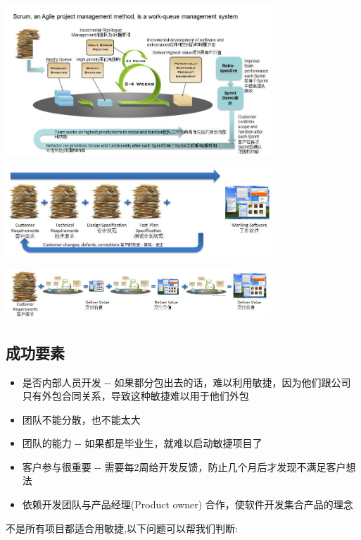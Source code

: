 \includegraphics[width=10cm]{0A_Agile_stories_p13.jpg}

\includegraphics[width=10cm]{P12_1.jpg}

\includegraphics[width=10cm]{P12_2.jpg}

\hypertarget{ux6210ux529fux8981ux7d20}{%
\subsection{成功要素}\label{ux6210ux529fux8981ux7d20}}

\begin{itemize}
\tightlist
\item
  是否内部人员开发 -\/-
  如果都分包出去的话，难以利用敏捷，因为他们跟公司只有外包合同关系，导致这种敏捷难以用于他们外包
\item
  团队不能分散，也不能太大
\item
  团队的能力 -\/- 如果都是毕业生，就难以启动敏捷项目了
\item
  客户参与很重要 -\/-
  需要每2周给开发反馈，防止几个月后才发现不满足客户想法
\item
  依赖开发团队与产品经理(Product owner) 合作，使软件开发集合产品的理念
\end{itemize}

不是所有项目都适合用敏捷,以下问题可以帮我们判断:

